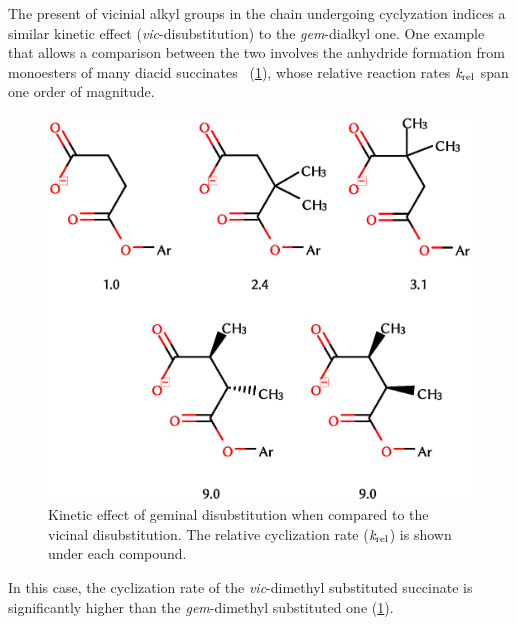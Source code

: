 The present of vicinial alkyl groups in the chain undergoing cyclyzation
indices a similar kinetic effect (\emph{vic}-disubstitution)
to the \emph{gem}-dialkyl one.
One example that allows a comparison between the two
involves the anhydride formation from monoesters of many diacid
succinates~\cite{Kirby_1980,Bruice_1960a,Bruice_1960b,Bruice_1965,Lightstone_1994}
(\cref{fig:succinatos}), whose relative reaction rates
$\emph{k}_\text{rel}$ span one order of magnitude.
%
\begin{figure}[hbtp]
    \centering
    \includegraphics[width=.75\textwidth]{figures/succinatos}
    \caption[Kinetic effects of geminal and vicinal disubstitutions.]{
        Kinetic effect of geminal disubstitution when compared to the vicinal disubstitution.
        The relative cyclization rate ($\emph{k}_\text{rel}$)
        is shown under each compound.}\label{fig:succinatos}
\end{figure}
%
In this case, the
cyclization rate
of the
\emph{vic}-dimethyl substituted
succinate
is significantly higher than the \emph{gem}-dimethyl substituted one
(\cref{fig:succinatos}).

